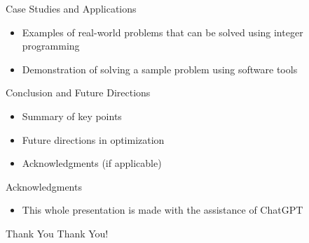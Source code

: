 \documentclass{beamer}
\begin{document}
\begin{frame}{Case Studies and Applications}
    \begin{itemize}
        \item Examples of real-world problems that can be solved using integer programming
        \item Demonstration of solving a sample problem using software tools
    \end{itemize}
\end{frame}

\begin{frame}{Conclusion and Future Directions}
    \begin{itemize}
        \item Summary of key points
        \item Future directions in optimization
        \item Acknowledgments (if applicable)
    \end{itemize}
\end{frame}

\begin{frame}{Acknowledgments}
    \begin{itemize}
        \item This whole presentation is made with the assistance of ChatGPT
    \end{itemize}
\end{frame}

\begin{frame}{Thank You}
    \centering
    \Huge Thank You!
\end{frame}
\end{document}
